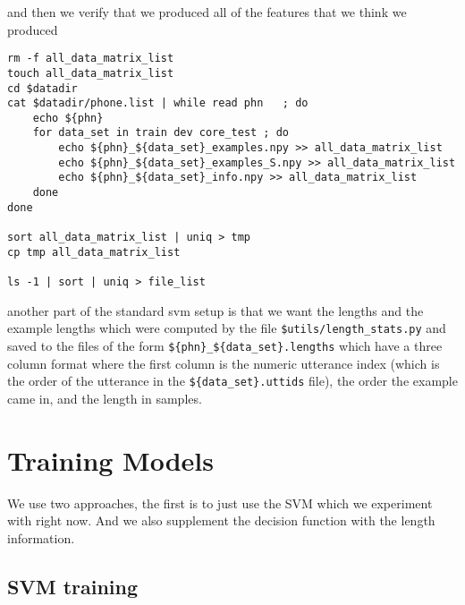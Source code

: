 \documentclass{article}
\begin{document}
and then we verify that we produced all of the features that
we think we produced
\begin{verbatim}
rm -f all_data_matrix_list
touch all_data_matrix_list
cd $datadir
cat $datadir/phone.list | while read phn   ; do
    echo ${phn}
    for data_set in train dev core_test ; do
        echo ${phn}_${data_set}_examples.npy >> all_data_matrix_list
        echo ${phn}_${data_set}_examples_S.npy >> all_data_matrix_list
        echo ${phn}_${data_set}_info.npy >> all_data_matrix_list
    done
done

sort all_data_matrix_list | uniq > tmp
cp tmp all_data_matrix_list

ls -1 | sort | uniq > file_list
\end{verbatim}

another part of the standard svm setup is that we want the lengths
and the example lengths which were computed by the file \texttt{\$utils/length\_stats.py} and saved to the files of the form \texttt{\$\{phn\}\_\$\{data\_set\}.lengths} which have a three column format
where the first column is the numeric utterance index (which is the
order of the utterance in the \texttt{\$\{data\_set\}.uttids} file),
the order the example came in, and the length in samples.


\section{Training Models}

We use two approaches, the first is to just use the SVM which 
we experiment with right now.  And we also supplement the 
decision function with the length information.

\subsection{SVM training}
\end{document}
